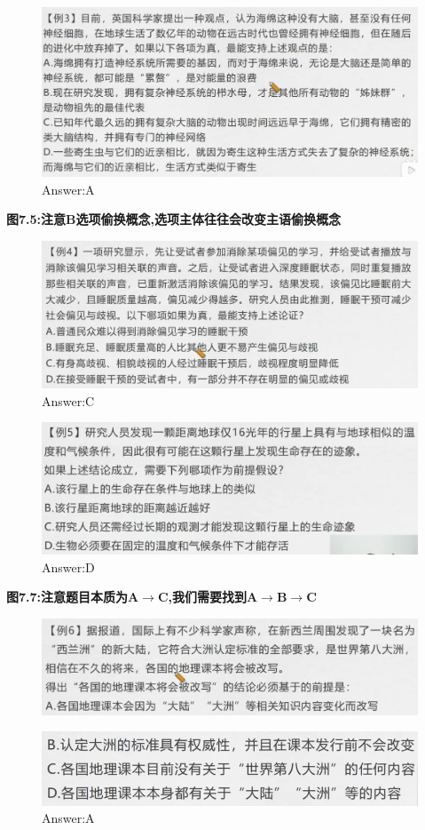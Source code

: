 \documentclass{article}
\numberwithin{equation}{section}						%
\numberwithin{figure}{section}							%
\begin{document}
\begin{sloppypar}
\begin{figure}[H]
     \centering
     \includegraphics[width=0.6\linewidth]{223.png}
		\caption{Answer:A}
\end{figure}

\textbf{图7.5:注意B选项偷换概念,选项主体往往会改变主语偷换概念}

\begin{figure}[H]
     \centering
     \includegraphics[width=0.6\linewidth]{224.png}
		\caption{Answer:C}
\end{figure}


\begin{figure}[H]
     \centering
     \includegraphics[width=0.6\linewidth]{225.png}
		\caption{Answer:D}
\end{figure}

\textbf{图7.7:注意题目本质为A$\rightarrow$C,我们需要找到A$\rightarrow$B$\rightarrow$C}


\begin{figure}[H]
     \centering
     \includegraphics[width=0.6\linewidth]{226.png}
\end{figure}


\begin{figure}[H]
     \centering
     \includegraphics[width=0.5\linewidth]{227.png}
		\caption{Answer:A}
\end{figure}



\end{sloppypar}
\end{document}
